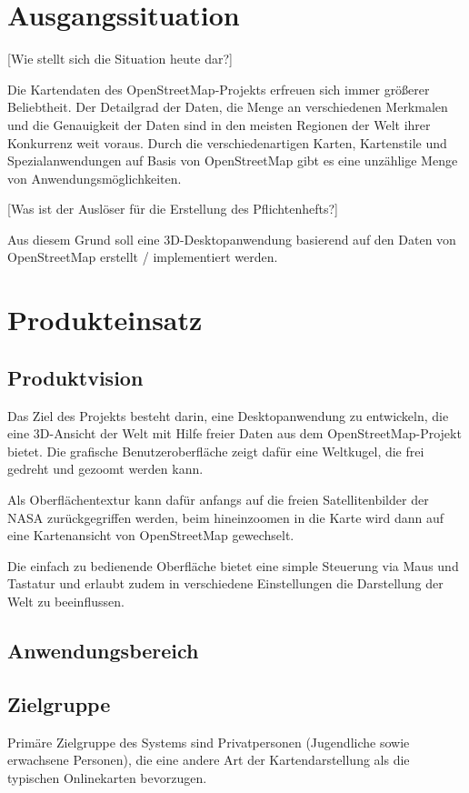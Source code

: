 \documentclass[10pt]{scrreprt}
\begin{document}
\tableofcontents



\chapter{Ausgangssituation}
[Wie stellt sich die Situation heute dar?]

Die Kartendaten des OpenStreetMap-Projekts erfreuen sich immer größerer Beliebtheit. Der Detailgrad der Daten, die Menge an verschiedenen Merkmalen und die Genauigkeit der Daten sind in den meisten Regionen der Welt ihrer Konkurrenz weit voraus. Durch die verschiedenartigen Karten, Kartenstile und Spezialanwendungen auf Basis von OpenStreetMap gibt es eine unzählige Menge von Anwendungsmöglichkeiten.


[Was ist der Auslöser für die Erstellung des Pflichtenhefts?]

Aus diesem Grund soll eine 3D-Desktopanwendung basierend auf den Daten von OpenStreetMap erstellt / implementiert werden.




\chapter{Produkteinsatz}
\section{Produktvision}
Das Ziel des Projekts besteht darin, eine Desktopanwendung zu entwickeln, die eine 3D-Ansicht der Welt mit Hilfe freier Daten aus dem OpenStreetMap-Projekt bietet. Die grafische Benutzeroberfläche zeigt dafür eine Weltkugel, die frei gedreht und gezoomt werden kann. 

Als Oberflächentextur kann dafür anfangs auf die freien Satellitenbilder der
NASA zurückgegriffen werden, beim hineinzoomen in die Karte wird dann auf eine Kartenansicht von OpenStreetMap gewechselt.

Die einfach zu bedienende Oberfläche bietet eine simple Steuerung via Maus und Tastatur und erlaubt zudem in verschiedene Einstellungen die Darstellung der Welt zu beeinflussen. 


\section{Anwendungsbereich}


\section{Zielgruppe}
Primäre Zielgruppe des Systems sind Privatpersonen (Jugendliche sowie erwachsene Personen), die eine andere Art der Kartendarstellung als die typischen Onlinekarten bevorzugen.
\end{document}
